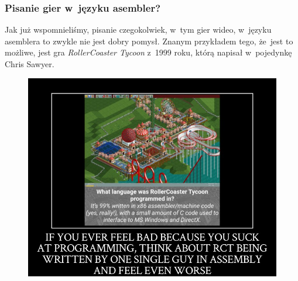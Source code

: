\documentclass[10pt,t]{beamer}
\begin{document}
\begin{frame}
  \frametitle{Pisanie gier w~języku asembler?}


  Jak już wspomnieliśmy, pisanie czegokolwiek, w~tym gier wideo, w~języku
  asemblera to zwykle nie jest dobry pomysł. Znanym przykładem tego, że~jest
  to możliwe, jest gra \textit{RollerCoaster Tycoon} z~1999 roku, którą
  napisał \alert{w~pojedynkę} Chris Sawyer.





  \begin{figure}

    \label{fig:Feel-even-worse}

    \centering


    \includegraphics[scale=0.275]
    {./Presentations-pictures/Feel-even-worse.jpg}

  \end{figure}

\end{frame}
\end{document}
